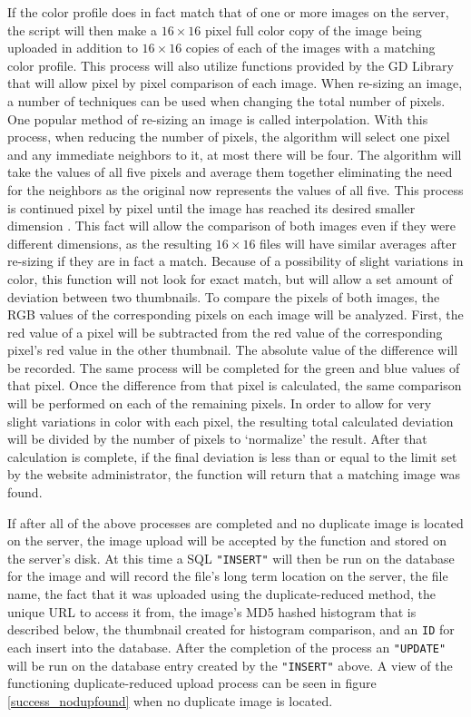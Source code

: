 If the color profile does in fact match that of one or more images on the server, the script will then make a $16\times16$ pixel full color copy of the image being uploaded in addition to $16\times16$ copies of each of the images with a matching color profile. This process will also utilize functions provided by the GD Library that will allow pixel by pixel comparison of each image. When re-sizing an image, a number of techniques can be used when changing the total number of pixels. One popular method of re-sizing an image is called interpolation. With this process, when reducing the number of pixels, the algorithm will select one pixel and any immediate neighbors to it, at most there will be four. The algorithm will take the values of all five pixels and average them together eliminating the need for the neighbors as the original now represents the values of all five. This process is continued pixel by pixel until the image has reached its desired smaller dimension \cite{Acharya:2007}. This fact will allow the comparison of both images even if they were different dimensions, as the resulting $16\times16$ files will have similar averages after re-sizing if they are in fact a match. Because of a possibility of slight variations in color, this function will not look for exact match, but will allow a set amount of deviation between two thumbnails. To compare the pixels of both images, the RGB values of the corresponding pixels on each image will be analyzed. First, the red value of a pixel will be subtracted from the red value of the corresponding pixel's red value in the other thumbnail. The absolute value of the difference will be recorded. The same process will be completed for the green and blue values of that pixel. Once the difference from that pixel is calculated, the same comparison will be performed on each of the remaining pixels. In order to allow for very slight variations in color with each pixel, the resulting total calculated deviation will be divided by the number of pixels to `normalize' the result. After that calculation is complete, if the final deviation is less than or equal to the limit set by the website administrator, the function will return that a matching image was found.

If after all of the above processes are completed and no duplicate image is located on the server, the image upload will be accepted by the function and stored on the server's disk. At this time a SQL {\tt "INSERT"} will then be run on the database for the image and will record the file's long term location on the server, the file name, the fact that it was uploaded using the duplicate-reduced method, the unique URL to access it from, the image's MD5 hashed histogram that is described below, the thumbnail created for histogram comparison, and an {\tt ID} for each insert into the database. After the completion of the process an {\tt "UPDATE"} will be run on the database entry created by the {\tt "INSERT"} above. A view of the functioning duplicate-reduced upload process can be seen in figure \ref{success_nodupfound} when no duplicate image is located.

